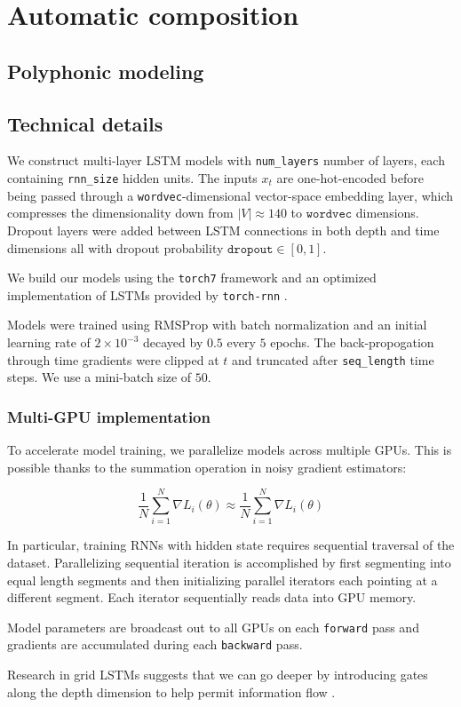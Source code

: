 \chapter{Automatic composition}

\section{Polyphonic modeling}

\section{Technical details}

We construct multi-layer LSTM models with \texttt{num\_layers} number of
layers, each containing \texttt{rnn\_size} hidden units. The inputs $x_t$ are
one-hot-encoded before being passed through a \texttt{wordvec}-dimensional
vector-space embedding layer, which compresses the dimensionality down from
$|V| \approx 140$ to $\texttt{wordvec}$ dimensions. Dropout layers were added
between LSTM connections in both depth and time dimensions all with dropout
probability $\texttt{dropout} \in [0,1]$.

We build our models using the \texttt{torch7} framework and
an optimized implementation of LSTMs provided by \texttt{torch-rnn} .

Models were trained using RMSProp  with batch normalization 
and an initial learning rate of $2 \times 10^{-3}$ decayed by $0.5$ every $5$
epochs. The back-propogation through time gradients were clipped
at $t$  and truncated after \texttt{seq\_length} time steps.
We use a mini-batch size of $50$.

\subsection{Multi-GPU implementation}

To accelerate model training, we parallelize models across multiple GPUs. This is possible
thanks to the summation operation in noisy gradient estimators:

\begin{equation}
  \frac{1}{N} \sum_{i=1}^N \nabla L_i(\theta) \approx \frac{1}{N} \sum_{i=1}^N \nabla L_i(\theta)
\end{equation}

In particular, training RNNs with hidden state requires sequential traversal
of the dataset. Parallelizing sequential iteration is accomplished by first segmenting
into equal length segments and then initializing parallel iterators each
pointing at a different segment. Each iterator sequentially reads data
into GPU memory.

Model parameters are broadcast out to all GPUs on each \texttt{forward} pass
and gradients are accumulated during each \texttt{backward} pass.

Research in grid LSTMs suggests that we can go deeper by introducing
gates along the depth dimension to help permit information flow .
